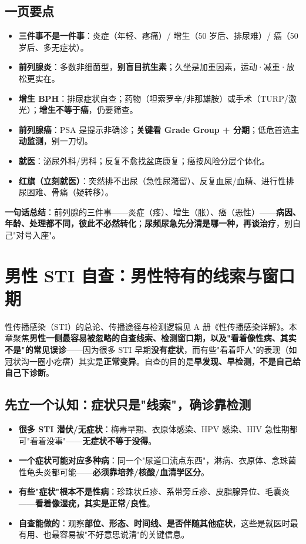 \documentclass[12pt,UTF8,openany]{ctexbook}
\begin{document}
\section{一页要点}
\begin{itemize}[leftmargin=2em,itemsep=0.2em]
  \item \textbf{三件事不是一件事}：炎症（年轻、疼痛）/ 增生（50 岁后、排尿难）/ 癌（50 岁后、多无症状）。
  \item \textbf{前列腺炎}：多数非细菌型，\textbf{别盲目抗生素}；久坐是加重因素，运动·减重·放松更实在。
  \item \textbf{增生 BPH}：排尿症状自查；药物（坦索罗辛/非那雄胺）或手术（TURP/激光）；\textbf{增生不等于癌}，仍要筛查。
  \item \textbf{前列腺癌}：PSA 是提示非确诊；\textbf{关键看 Grade Group + 分期}；低危首选\textbf{主动监测}，别一刀切。
  \item \textbf{就医}：泌尿外科/男科；反复不愈找盆底康复；癌按风险分层个体化。
  \item \textbf{红旗（立刻就医）}：突然排不出尿（急性尿潴留）、反复血尿/血精、进行性排尿困难、骨痛（疑转移）。
\end{itemize}

\vspace{1em}
\noindent\textbf{一句话总结}：前列腺的三件事——炎症（疼）、增生（胀）、癌（恶性）——\textbf{病因、年龄、处理都不同，彼此不必然转化}；\textbf{尿频尿急先分清是哪一种，再谈治疗}，别自己"对号入座"。

\chapter{男性 STI 自查：男性特有的线索与窗口期}
\label{chap:male-sti}

性传播感染（STI）的总论、传播途径与检测逻辑见 A 册《性传播感染详解》。本章聚焦\textbf{男性一侧最容易被忽略的自查线索、检测窗口期，以及"看着像性病、其实不是"的常见误诊}——因为很多 STI 早期\textbf{没有症状}，而有些"看着吓人"的表现（如冠状沟一圈小疙瘩）其实是\textbf{正常变异}。自查的目的是\textbf{早发现、早检测}，\textbf{不是自己给自己下诊断}。

\section{先立一个认知：症状只是"线索"，确诊靠检测}

\begin{itemize}[leftmargin=2em,itemsep=0.3em]
  \item \textbf{很多 STI 潜伏/无症状}：梅毒早期、衣原体感染、HPV 感染、HIV 急性期都可"看着没事"——\textbf{无症状不等于没得}。
  \item \textbf{一个症状可能对应多种病}：同一个"尿道口流点东西"，淋病、衣原体、念珠菌性龟头炎都可能——\textbf{必须靠培养/核酸/血清学区分}。
  \item \textbf{有些"症状"根本不是性病}：珍珠状丘疹、系带旁丘疹、皮脂腺异位、毛囊炎——\textbf{看着像湿疣，其实是正常/良性}。
  \item \textbf{自查能做的}：观察\textbf{部位、形态、时间线、是否伴随其他症状}，这些是就医时最有用、也最容易被"不好意思说清"的关键信息。
\end{itemize}
\end{document}
